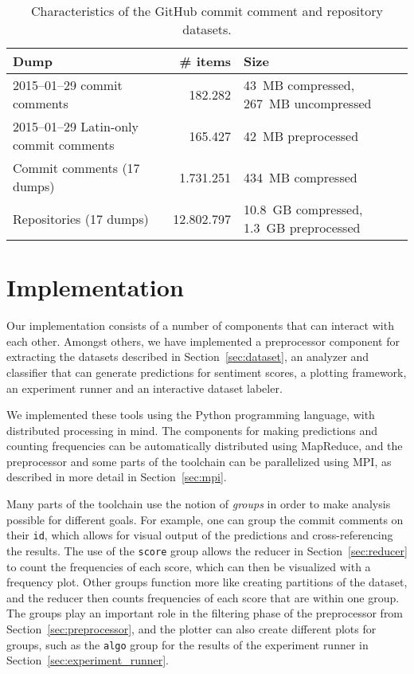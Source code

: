 \documentclass{article}
\begin{document}
\begin{table}[h]
  \centering
  \begin{tabular}{l r l}
    \toprule
    \textbf{Dump}                           & \textbf{\# items} & \textbf{Size}                           \\
    \midrule
    2015--01--29 commit comments            & 182.282           & 43~MB compressed, 267~MB uncompressed   \\
    2015--01--29 Latin-only commit comments & 165.427           & 42~MB preprocessed                      \\
    Commit comments (17 dumps)              & 1.731.251         & 434~MB compressed                       \\
    Repositories (17 dumps)                 & 12.802.797        & 10.8~GB compressed, 1.3~GB preprocessed \\
    \bottomrule
  \end{tabular}
  \caption{Characteristics of the GitHub commit comment and repository datasets.}\label{tab:dataset}
\end{table}

\section{Implementation}\label{sec:implementation}

Our implementation consists of a number of components that can interact with 
each other. Amongst others, we have implemented a preprocessor component for 
extracting the datasets described in Section~\ref{sec:dataset}, an analyzer and 
classifier that can generate predictions for sentiment scores, a plotting 
framework, an experiment runner and an interactive dataset labeler.

We implemented these tools using the Python programming language, with 
distributed processing in mind. The components for making predictions and 
counting frequencies can be automatically distributed using MapReduce, and the 
preprocessor and some parts of the toolchain can be parallelized using MPI, as 
described in more detail in Section~\ref{sec:mpi}.

Many parts of the toolchain use the notion of \emph{groups} in order to make 
analysis possible for different goals. For example, one can group the commit 
comments on their {\tt id}, which allows for visual output of the predictions 
and cross-referencing the results. The use of the {\tt score} group allows the 
reducer in Section~\ref{sec:reducer} to count the frequencies of each score, 
which can then be visualized with a frequency plot. Other groups function more 
like creating partitions of the dataset, and the reducer then counts 
frequencies of each score that are within one group. The groups play an 
important role in the filtering phase of the preprocessor from 
Section~\ref{sec:preprocessor}, and the plotter can also create different plots 
for groups, such as the {\tt algo} group for the results of the experiment 
runner in Section~\ref{sec:experiment_runner}.
\end{document}
